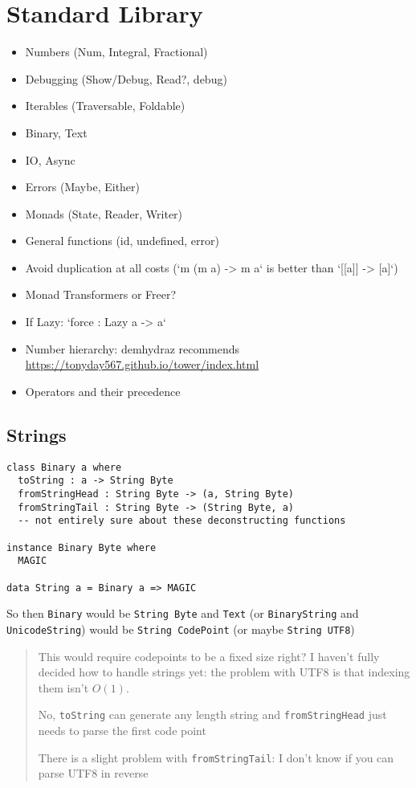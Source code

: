 \section{Standard Library}

\begin{itemize}
\item Numbers (Num, Integral, Fractional)
\item Debugging (Show/Debug, Read?, debug)
\item Iterables (Traversable, Foldable)
\item Binary, Text
\item IO, Async
\item Errors (Maybe, Either)
\item Monads (State, Reader, Writer)
\item General functions (id, undefined, error)
\item Avoid duplication at all costs (`m (m a) -> m a` is better than `[[a]] -> [a]`)
\item Monad Transformers or Freer?
\item If Lazy: `force : Lazy a -> a`
\item Number hierarchy: demhydraz recommends \url{https://tonyday567.github.io/tower/index.html}
\item Operators and their precedence
\end{itemize}

\subsection{Strings}
\begin{verbatim}
class Binary a where
  toString : a -> String Byte
  fromStringHead : String Byte -> (a, String Byte)
  fromStringTail : String Byte -> (String Byte, a)
  -- not entirely sure about these deconstructing functions

instance Binary Byte where
  MAGIC

data String a = Binary a => MAGIC
\end{verbatim}

So then \texttt{Binary} would be \texttt{String Byte} and \texttt{Text} (or \texttt{BinaryString} and \texttt{UnicodeString}) would be \texttt{String CodePoint} (or maybe \texttt{String UTF8})

\begin{quote}
This would require codepoints to be a fixed size right? I haven't fully decided how to handle strings yet: the problem with UTF8 is that indexing them isn't $O(1)$.

No, \texttt{toString} can generate any length string and \texttt{fromStringHead} just needs to parse the first code point

There is a slight problem with \texttt{fromStringTail}: I don't know if you can parse UTF8 in reverse
\end{quote}